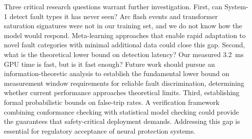 \documentclass[journal]{IEEEtran}
\begin{document}
Three critical research questions warrant further investigation. First, can System-1 detect fault types it has never seen? Arc flash events and transformer saturation signatures were not in our training set, and we do not know how the model would respond. Meta-learning approaches that enable rapid adaptation to novel fault categories with minimal additional data could close this gap. Second, what is the theoretical lower bound on detection latency? Our measured 3.2~ms GPU time is fast, but is it fast enough? Future work should pursue an information-theoretic analysis to establish the fundamental lower bound on measurement window requirements for reliable fault discrimination, determining whether current performance approaches theoretical limits. Third, establishing formal probabilistic bounds on false-trip rates. A verification framework combining conformance checking with statistical model checking could provide the guarantees that safety-critical deployment demands. Addressing this gap is essential for regulatory acceptance of neural protection systems.
\end{document}
